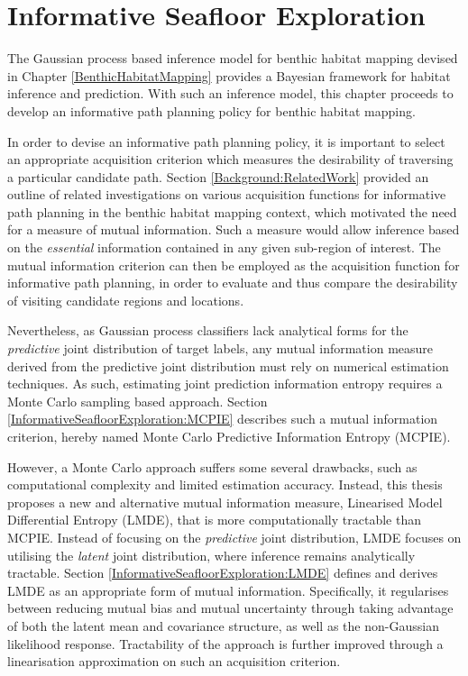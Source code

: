 \chapter{Informative Seafloor Exploration}
\label{InformativeSeafloorExploration}

	The Gaussian process based inference model for benthic habitat mapping devised in Chapter \ref{BenthicHabitatMapping} provides a Bayesian framework for habitat inference and prediction. With such an inference model, this chapter proceeds to develop an informative path planning policy for benthic habitat mapping.
	
	In order to devise an informative path planning policy, it is important to select an appropriate acquisition criterion which measures the desirability of traversing a particular candidate path. Section \ref{Background:RelatedWork} provided an outline of related investigations on various acquisition functions for informative path planning in the benthic habitat mapping context, which motivated the need for a measure of mutual information. Such a measure would allow inference based on the \textit{essential} information contained in any given sub-region of interest. The mutual information criterion can then be employed as the acquisition function for informative path planning, in order to evaluate and thus compare the desirability of visiting candidate regions and locations.
	
	Nevertheless, as Gaussian process classifiers lack analytical forms for the \textit{predictive} joint distribution of target labels, any mutual information measure derived from the predictive joint distribution must rely on numerical estimation techniques. As such, estimating joint prediction information entropy requires a Monte Carlo sampling based approach. Section \ref{InformativeSeafloorExploration:MCPIE} describes such a mutual information criterion, hereby named Monte Carlo Predictive Information Entropy (MCPIE).
	
	However, a Monte Carlo approach suffers some several drawbacks, such as computational complexity and limited estimation accuracy. Instead, this thesis proposes a new and alternative mutual information measure, Linearised Model Differential Entropy (LMDE), that is more computationally tractable than MCPIE. Instead of focusing on the \textit{predictive} joint distribution, LMDE focuses on utilising the \textit{latent} joint distribution, where inference remains analytically tractable. Section \ref{InformativeSeafloorExploration:LMDE} defines and derives LMDE as an appropriate form of mutual information. Specifically, it regularises between reducing mutual bias and mutual uncertainty through taking advantage of both the latent mean and covariance structure, as well as the non-Gaussian likelihood response. Tractability of the approach is further improved through a linearisation approximation on such an acquisition criterion.
	
